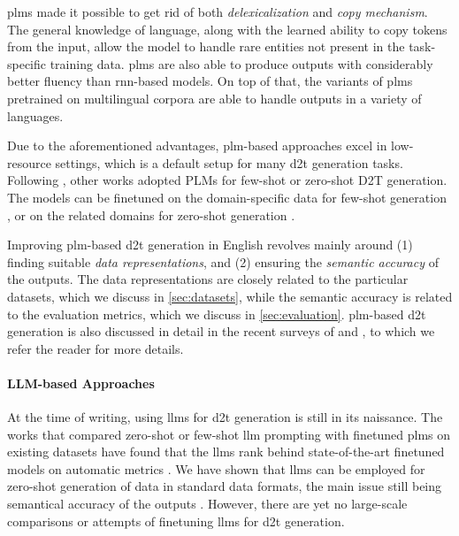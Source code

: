 {\acp{plm} made it possible to get rid of both \emph{delexicalization} and \emph{copy mechanism}. The general knowledge of language, along with the learned ability to copy tokens from the input, allow the model to handle rare entities not present in the task-specific training data. \acp{plm} are also able to produce outputs with considerably better fluency than \ac{rnn}-based models. On top of that, the variants of \acp{plm} pretrained on multilingual corpora \cite{liuMultilingualDenoisingPretraining2020,xueMT5MassivelyMultilingual2021} are able to handle outputs in a variety of languages.

Due to the aforementioned advantages, \ac{plm}-based approaches excel in low-resource settings, which is a default setup for many \ac{d2t} generation tasks. Following \citet{chenFewShotNLGPreTrained2019}, other works adopted PLMs for few-shot or zero-shot D2T generation. The models can be finetuned on the domain-specific data for few-shot generation \cite{changNeuralDatatoTextGeneration2021,suFewShotTabletoTextGeneration2021}, or on the related domains for zero-shot generation \cite{kasner2022neural,kasnerMindLabelsDescribing2022}.

Improving \ac{plm}-based \ac{d2t} generation in English revolves mainly around (1) finding suitable \emph{data representations}, and (2) ensuring the \emph{semantic accuracy} of the outputs. The data representations are closely related to the particular datasets, which we discuss in \autoref{sec:datasets}, while the semantic accuracy is related to the evaluation metrics, which we discuss in \autoref{sec:evaluation}. \ac{plm}-based \ac{d2t} generation is also discussed in detail in the recent surveys of \citet{sharmaInnovationsNeuralDatatotext2022} and \citet{lin2023survey}, to which we refer the reader for more details.

\paragraph{LLM-based Approaches} At the time of writing, using \acp{llm} for \ac{d2t} generation is still in its naissance. The works that compared zero-shot or few-shot \ac{llm} prompting with finetuned \acp{plm} on existing datasets have found that the \acp{llm} rank behind state-of-the-art finetuned models on automatic metrics \cite{axelssonUsingLargeLanguage2023,yuanEvaluatingGenerativeModels2023}. We have shown that \acp{llm} can be employed for zero-shot generation of data in standard data formats, the main issue still being semantical accuracy of the outputs \cite{kasnerReferenceBasedMetricsAnalyzing2024}. However, there are yet no large-scale comparisons or attempts of finetuning \acp{llm} for \ac{d2t} generation.

}
